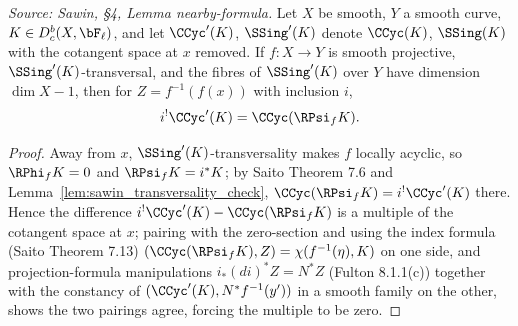 \begin{lemma}
  \label{lem:sawin_nearby_formula}
  \textit{Source: Sawin, §4, Lemma nearby-formula.}
  Let $X$ be smooth, $Y$ a smooth curve, $K\in D^b_c(X,\bF_\ell)$, and let
  $\CCyc'(K)$, $\SSing'(K)$ denote $\CCyc(K)$, $\SSing(K)$ with the cotangent
  space at $x$ removed.  If $f:X\to Y$ is smooth projective, $\SSing'(K)$-transversal,
  and the fibres of $\SSing'(K)$ over $Y$ have dimension $\dim X-1$, then for
  $Z=f^{-1}(f(x))$ with inclusion $i$,
  \[ i^!\CCyc'(K) = \CCyc(\RPsi_f K). \]
\end{lemma}
\begin{proof}
  Away from $x$, $\SSing'(K)$-transversality makes $f$ locally acyclic, so
  $\RPhi_f K=0$ and $\RPsi_f K=i^*K$; by Saito Theorem 7.6 and
  Lemma~\ref{lem:sawin_transversality_check}, $\CCyc(\RPsi_f K)=i^!\CCyc'(K)$
  there.  Hence the difference $i^!\CCyc'(K)-\CCyc(\RPsi_f K)$ is a multiple of
  the cotangent space at $x$; pairing with the zero-section and using the index
  formula (Saito Theorem 7.13) $(\CCyc(\RPsi_f K),Z)=\chi(f^{-1}(\eta),K)$ on one
  side, and projection-formula manipulations $i_*(di)^*Z = N^*Z$ (Fulton
  8.1.1(c)) together with the constancy of $(\CCyc'(K),N^*f^{-1}(y'))$ in a smooth
  family on the other, shows the two pairings agree, forcing the multiple to be
  zero.
\end{proof}

